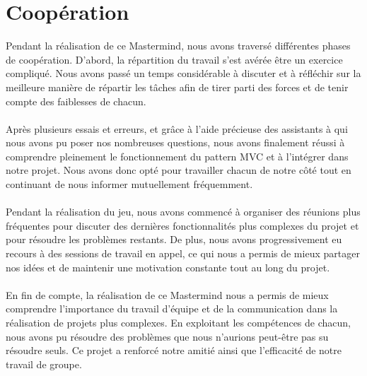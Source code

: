 
\section{Coopération}

Pendant la réalisation de ce Mastermind, nous avons traversé différentes phases de coopération. D'abord, la répartition du travail s'est avérée être un exercice compliqué. Nous avons passé un temps considérable à discuter et à réfléchir sur la meilleure manière de répartir les tâches afin de tirer parti des forces et de tenir compte des faiblesses de chacun.
\\\\
Après plusieurs essais et erreurs, et grâce à l'aide précieuse des assistants à qui nous avons pu poser nos nombreuses questions, nous avons finalement réussi à comprendre pleinement le fonctionnement du pattern MVC et à l'intégrer dans notre projet. Nous avons donc opté pour travailler chacun de notre côté tout en continuant de nous informer mutuellement fréquemment.
\\\\
Pendant la réalisation du jeu, nous avons commencé à organiser des réunions plus fréquentes pour discuter des dernières fonctionnalités plus complexes du projet et pour résoudre les problèmes restants. De plus, nous avons progressivement eu recours à des sessions de travail en appel, ce qui nous a permis de mieux partager nos idées et de maintenir une motivation constante tout au long du projet.
\\\\
En fin de compte, la réalisation de ce Mastermind nous a permis de mieux comprendre l'importance du travail d'équipe et de la communication dans la réalisation de projets plus complexes. En exploitant les compétences de chacun, nous avons pu résoudre des problèmes que nous n'aurions peut-être pas su résoudre seuls. Ce projet a renforcé notre amitié ainsi que l'efficacité de notre travail de groupe.